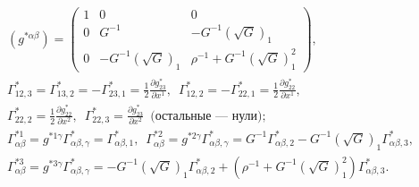 \begin{gather*} 


(g^{*\alpha\beta})= 


\begin{pmatrix} 


1 & 0 & 0 \\ 


0 & G^{-1} & -G^{-1}(\sqrt{G})_1 \\ 


0 & -G^{-1}(\sqrt{G})_1 & \rho^{-1}+G^{-1}(\sqrt{G})^2_1 


\end{pmatrix} 


, \\ 


% 


\Gamma^*_{12,3}=\Gamma^*_{13,2}=-\Gamma^*_{23,1}= 


\frac{1}{2}\frac{\partial g^*_{23}}{\partial x^1}, 


\ \; \Gamma^*_{12,2}=-\Gamma^*_{22,1}=\frac{1}{2} 


\frac{\partial g^*_{22}}{\partial x^1}, \\


%


\Gamma^*_{22,2}=\frac{1}{2} 


\frac{\partial g^*_{22}}{\partial x^2}, 


\ \; \Gamma^*_{22,3}=\frac{\partial g^*_{23}}{\partial x^2} 


\ \; \text{(остальные --- нули)};\\ 


% 


\Gamma^{*1}_{\alpha\beta}=g^{*1\gamma}\Gamma^*_{\alpha\beta,\gamma}= 


\Gamma^*_{\alpha\beta,1}, 


\ \; \Gamma^{*2}_{\alpha\beta}=g^{*2\gamma} 


\Gamma^*_{\alpha\beta,\gamma}=G^{-1} 


\Gamma^*_{\alpha\beta,2}-G^{-1}(\sqrt{G})_1 


\Gamma^*_{\alpha\beta,3}, \\ 


% 


\Gamma^{*3}_{\alpha\beta}=g^{*3\gamma} 


\Gamma^*_{\alpha\beta,\gamma}=-G^{-1}(\sqrt{G})_1 


\Gamma^*_{\alpha\beta,2}+(\rho^{-1}+G^{-1}(\sqrt{G})^2_1) 


\Gamma^*_{\alpha\beta,3}. 


\end{gather*} 



